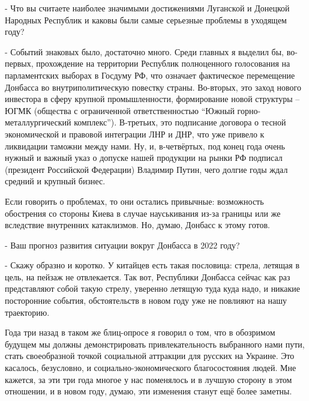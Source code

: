 - Что вы считаете наиболее значимыми достижениями Луганской и Донецкой Народных
Республик и каковы были самые серьезные проблемы в уходящем году?

- Событий знаковых было, достаточно много. Среди главных я выделил бы,
во-первых, прохождение на территории Республик полноценного голосования на
парламентских выборах в Госдуму РФ, что означает фактическое перемещение
Донбасса во внутриполитическую повестку страны. Во-вторых, это заход нового
инвестора в сферу крупной промышленности, формирование новой структуры – ЮГМК
(общества с ограниченной ответственностью \enquote{Южный горно-металлургический
комплекс}). В-третьих, это подписание договора о тесной экономической и
правовой интеграции ЛНР и ДНР, что уже привело к ликвидации таможни между нами.
Ну, и, в-четвёртых, под конец года очень нужный и важный указ о допуске нашей
продукции на рынки РФ подписал (президент Российской Федерации) Владимир Путин,
чего долгие годы ждал средний и крупный бизнес.

Если говорить о проблемах, то они остались привычные: возможность обострения со
стороны Киева в случае науськивания из-за границы или же вследствие внутренних
катаклизмов. Но, думаю, Донбасс к этому готов.

- Ваш прогноз развития ситуации вокруг Донбасса в 2022 году?

- Скажу образно и коротко. У китайцев есть такая пословица: стрела, летящая в
цель, на пейзаж не отвлекается. Так вот, Республики Донбасса сейчас как раз
представляют собой такую стрелу, уверенно летящую туда куда надо, и никакие
посторонние события, обстоятельств в новом году уже не повлияют на нашу
траекторию.

Года три назад в таком же блиц-опросе я говорил о том, что в обозримом будущем
мы должны демонстрировать привлекательность выбранного нами пути, стать
своеобразной точкой социальной аттракции для русских на Украине. Это касалось,
безусловно, и социально-экономического благосостояния людей. Мне кажется, за
эти три года многое у нас поменялось и в лучшую сторону в этом отношении, и в
новом году, думаю, эти изменения станут ещё более заметны.
